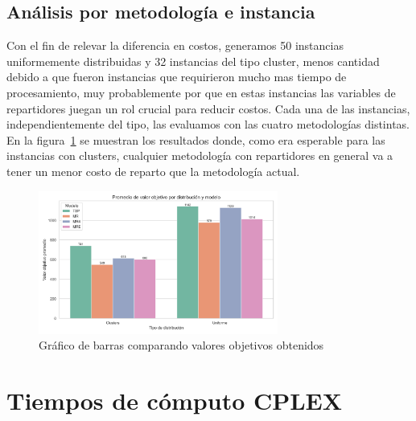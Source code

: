 \documentclass[10pt]{article}
\begin{document}
\subsection{Análisis por metodología e instancia}
Con el fin de relevar la diferencia en costos, generamos 50 instancias uniformemente distribuidas y 32 instancias del tipo cluster, menos cantidad debido a que fueron instancias que requirieron mucho mas tiempo de procesamiento, muy probablemente por que en estas instancias las variables de repartidores juegan un rol crucial para reducir costos. Cada una de las instancias, independientemente del tipo, las evaluamos con las cuatro metodologías distintas. 
En la figura~\ref{fig:barras_costos} se muestran los resultados donde, como era esperable para las instancias con clusters, cualquier metodología con repartidores en general va a tener un menor costo de reparto que la metodología actual. 

\begin{figure}[htbp]
	\centering
	\includegraphics[width=0.7\textwidth]{figuras/barras_costos.png}
	\caption{Gráfico de barras comparando valores objetivos obtenidos}
	\label{fig:barras_costos}
\end{figure}

\clearpage

\section{Tiempos de cómputo CPLEX}
\end{document}
